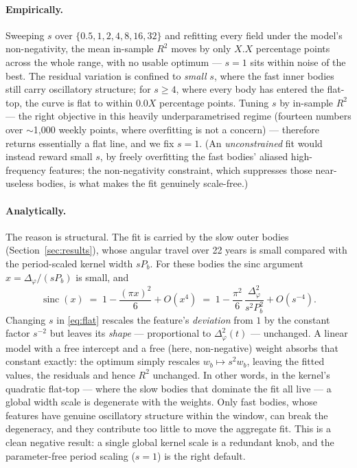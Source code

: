 \documentclass[11pt]{artaquest}
\newcommand{\scaleEps}{X.X}            %
\newcommand{\scaleFlat}{0.0X}          %
\begin{document}
\paragraph{Empirically.}
Sweeping $s$ over $\{0.5, 1, 2, 4, 8, 16, 32\}$ and refitting every field under the model's non-negativity,
the mean in-sample $R^2$ moves by only $\scaleEps$ percentage points across the whole range, with no usable
optimum --- $s=1$ sits within noise of the best. The residual variation is confined to \emph{small} $s$,
where the fast inner bodies still carry oscillatory structure; for $s\ge4$, where every body has entered
the flat-top, the curve is flat to within $\scaleFlat$ percentage points. Tuning $s$ by in-sample $R^2$ ---
the right objective in this heavily underparametrised regime (fourteen numbers over $\sim$1{,}000 weekly
points, where overfitting is not a concern) --- therefore returns essentially a flat line, and we fix
$s=1$. (An \emph{unconstrained} fit would instead reward small $s$, by freely overfitting the fast bodies'
aliased high-frequency features; the non-negativity constraint, which suppresses those near-useless bodies,
is what makes the fit genuinely scale-free.)

\paragraph{Analytically.}
The reason is structural. The fit is carried by the slow outer bodies (Section~\ref{sec:results}), whose
angular travel over 22 years is small compared with the period-scaled kernel width $s P_b$. For these
bodies the sinc argument $x = \Delta_\varphi/(sP_b)$ is small, and
\begin{equation}
  \operatorname{sinc}(x) \;=\; 1 - \frac{(\pi x)^2}{6} + O(x^4)
  \;=\; 1 - \frac{\pi^2}{6}\,\frac{\Delta_\varphi^2}{s^2 P_b^2} + O(s^{-4}).
  \label{eq:flat}
\end{equation}
Changing $s$ in \eqref{eq:flat} rescales the feature's \emph{deviation} from $1$ by the constant factor
$s^{-2}$ but leaves its \emph{shape} --- proportional to $\Delta_\varphi^2(t)$ --- unchanged. A linear
model with a free intercept and a free (here, non-negative) weight absorbs that constant exactly: the
optimum simply rescales $w_b \mapsto s^2 w_b$, leaving the fitted values, the residuals and hence $R^2$
unchanged. In other words, in the kernel's quadratic flat-top --- where the slow bodies that dominate the
fit all live --- a global width scale is degenerate with the weights. Only fast bodies, whose features
have genuine oscillatory structure within the window, can break the degeneracy, and they contribute too
little to move the aggregate fit. This is a clean negative result: a single global kernel scale is a
redundant knob, and the parameter-free period scaling ($s=1$) is the right default.
\end{document}
